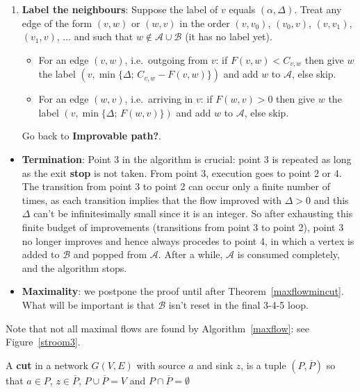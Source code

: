 \begin{code}
\begin{enumerate}
	\item \textbf{Label the neighbours}: Suppose the label of $v$ equals
	$(\alpha,\Delta)$. Treat any edge of the form $(v,w)$ or $(w,v)$ in
	the order $(v,v_{0})$, $(v_{0},v)$, $(v,v_{1})$, $(v_{1},v)$, $\ldots
	$ and such that $w\notin \mathcal{A}\cup\mathcal{B}$ (it has no label yet).
	\begin{itemize}
		\item For an edge $(v,w)$, i.e.\ outgoing from $v$:
		if $F(v,w) < C_{v,w}$ then give $w$ the label $(v,\min\{\Delta;\,C_{v,w}-F(v,w)\})$ and add $w$ to $\mathcal{A}$, else skip.
		
		\item For an edge $(w,v)$, i.e.\ arriving in $v$:
		if $F(w,v) > 0$ then give $w$ the label $(v,\min\{\Delta;\,F(w,v)\})$ and add $w$ to $\mathcal{A}$, else skip.
	\end{itemize}
	Go back to \textbf{Improvable path?}.
\end{enumerate}
\end{code}

\begin{proof*}
	\begin{itemize}
		\item \textbf{Termination}:
		Point 3 in the algorithm is crucial: point 3 is repeated as long as
		the exit \textbf{stop} is not taken. From point 3, execution goes to
		point 2 or 4. The transition from point 3 to point 2 can occur only a
		finite number of times, as each transition implies that the flow
		improved with $\Delta > 0$ and this $\Delta$ can't be infinitesimally
		small since it is an integer.
		So after exhausting this finite budget of improvements (transitions from point 3 to point 
		2), point 3 no longer improves and hence always procedes to point 4, in which a vertex is
		added to $\mathcal{B}$ and popped from $\mathcal{A}$. After a
		while, $\mathcal{A}$ is consumed completely, and the algorithm stops.
		
		\item \textbf{Maximality}: we postpone the proof until after
		Theorem~\ref{maxflowmincut}. What will be important is that $\mathcal{B}$ isn't reset in the final 3-4-5 loop.
	\end{itemize}\vspace{-2em}
\end{proof*}

Note that not all maximal flows are found by Algorithm~\ref{maxflow}:
see Figure~\ref{stroom3}.

\begin{definition}
  \textup{A \textbf{cut} in a network $G(V,E)$ with source $a$ and sink
    $z$, is a tuple $(P,\overline{P})$
    so that $a \in P$, $z \in \overline{P}$, $P
    \cup \overline{P} = V$ and $P \cap \overline{P} = \emptyset$ }
\end{definition}

